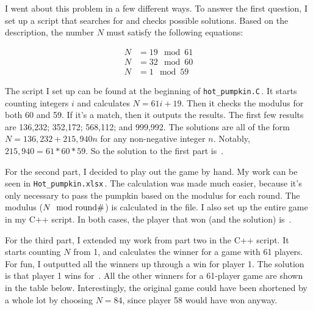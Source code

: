 \documentclass{article}
\begin{document}
I went about this problem in a few different ways.
To answer the first question, I set up a script that searches for and checks possible solutions.
Based on the description, the number $N$ must satisfy the following equations:

\begin{align*}
N&=19 \mod 61 \\
N&=32 \mod 60 \\
N&=1 \mod 59
\end{align*}

The script I set up can be found at the beginning of \texttt{hot\_pumpkin.C}\,.
It starts counting integers $i$ and calculates $N=61i+19$.
Then it checks the modulus for both 60 and 59.
If it's a match, then it outputs the results.
The first few results are 136,232; 352,172; 568,112; and 999,992.
The solutions are all of the form $N=136,232+215,940n$ for any non-negative integer $n$.
Notably, $215,940=61*60*59$.
So the solution to the first part is
\,.

For the second part, I decided to play out the game by hand.
My work can be seen in \texttt{Hot\_pumpkin.xlsx}\,.
The calculation was made much easier, because it's only necessary to pass the pumpkin based on the modulus for each round.
The modulus ($N\mod\rm{round \#}$) is calculated in the file.
I also set up the entire game in my C++ script.
In both cases, the player that won (and the solution) is
\,.

For the third part, I extended my work from part two in the C++ script.
It starts counting $N$ from 1, and calculates the winner for a game with 61 players.
For fun, I outputted all the winners up through a win for player 1.
The solution is that player 1 wins for
\,.
All the other winners for a 61-player game are shown in the table below.
Interestingly, the original game could have been shortened by a whole lot by choosing $N=84$, since player 58 would have won anyway.
\end{document}
